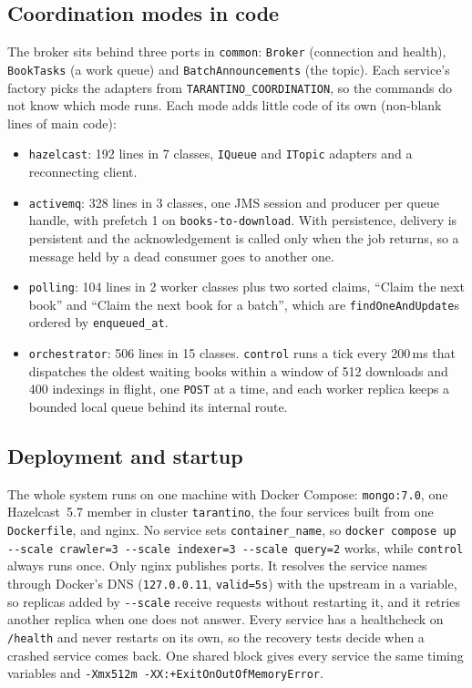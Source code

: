 \documentclass[11pt,a4paper]{article}
\newcommand{\code}[1]{\nolinkurl{#1}}
\newcommand{\mode}[1]{\code{#1}}
\begin{document}
\subsection{Coordination modes in code}

The broker sits behind three ports in \code{common}: \code{Broker} (connection and health), \code{BookTasks} (a work
queue) and \code{BatchAnnouncements} (the topic). Each service's factory picks the adapters from
\code{TARANTINO_COORDINATION}, so the commands do not know which mode runs. Each mode adds little code of its own
(non-blank lines of main code):
\begin{itemize}
\item \mode{hazelcast}: 192 lines in 7 classes, \code{IQueue} and \code{ITopic} adapters and a reconnecting client.
\item \mode{activemq}: 328 lines in 3 classes, one JMS session and producer per queue handle, with prefetch 1 on
  \code{books-to-download}. With persistence, delivery is persistent and the acknowledgement is called only when the
  job returns, so a message held by a dead consumer goes to another one.
\item \mode{polling}: 104 lines in 2 worker classes plus two sorted claims, ``Claim the next book'' and ``Claim the next
  book for a batch'', which are \code{findOneAndUpdate}s ordered by \code{enqueued_at}.
\item \mode{orchestrator}: 506 lines in 15 classes. \code{control} runs a tick every 200\,ms that dispatches the
  oldest waiting books within a window of 512 downloads and 400 indexings in flight, one \code{POST} at a time, and
  each worker replica keeps a bounded local queue behind its internal route.
\end{itemize}

\subsection{Deployment and startup}

The whole system runs on one machine with Docker Compose: \code{mongo:7.0}, one Hazelcast~5.7 member in cluster
\code{tarantino}, the four services built from one \code{Dockerfile}, and nginx. No service sets
\code{container_name}, so \texttt{docker compose up -{}-scale crawler=3 -{}-scale indexer=3 -{}-scale query=2} works,
while \code{control} always runs once. Only nginx publishes ports. It resolves the service names through Docker's DNS
(\code{127.0.0.11}, \code{valid=5s}) with the upstream in a variable, so replicas added by \texttt{-{}-scale} receive
requests without restarting it, and it retries another replica when one does not answer. Every service has a
healthcheck on \code{/health} and never restarts on its own, so the recovery tests decide when a crashed service comes
back. One shared block gives every service the same timing variables and \code{-Xmx512m -XX:+ExitOnOutOfMemoryError}.
\end{document}
